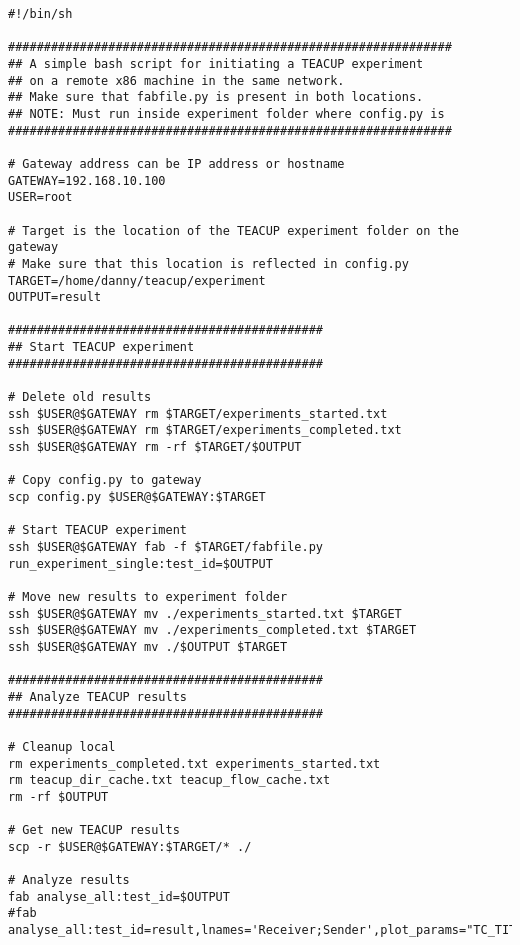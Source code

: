 \begin{code}
\begin{verbatim}
#!/bin/sh

##############################################################
## A simple bash script for initiating a TEACUP experiment
## on a remote x86 machine in the same network.
## Make sure that fabfile.py is present in both locations.
## NOTE: Must run inside experiment folder where config.py is
##############################################################

# Gateway address can be IP address or hostname
GATEWAY=192.168.10.100
USER=root

# Target is the location of the TEACUP experiment folder on the gateway
# Make sure that this location is reflected in config.py
TARGET=/home/danny/teacup/experiment
OUTPUT=result

############################################
## Start TEACUP experiment
############################################

# Delete old results
ssh $USER@$GATEWAY rm $TARGET/experiments_started.txt
ssh $USER@$GATEWAY rm $TARGET/experiments_completed.txt
ssh $USER@$GATEWAY rm -rf $TARGET/$OUTPUT

# Copy config.py to gateway
scp config.py $USER@$GATEWAY:$TARGET

# Start TEACUP experiment
ssh $USER@$GATEWAY fab -f $TARGET/fabfile.py run_experiment_single:test_id=$OUTPUT

# Move new results to experiment folder
ssh $USER@$GATEWAY mv ./experiments_started.txt $TARGET
ssh $USER@$GATEWAY mv ./experiments_completed.txt $TARGET
ssh $USER@$GATEWAY mv ./$OUTPUT $TARGET

############################################
## Analyze TEACUP results
############################################

# Cleanup local
rm experiments_completed.txt experiments_started.txt
rm teacup_dir_cache.txt teacup_flow_cache.txt
rm -rf $OUTPUT

# Get new TEACUP results
scp -r $USER@$GATEWAY:$TARGET/* ./

# Analyze results
fab analyse_all:test_id=$OUTPUT
#fab analyse_all:test_id=result,lnames='Receiver;Sender',plot_params="TC_TITLE\='Title'"
\end{verbatim}
\label{code:teacup-init}
\end{code}



















